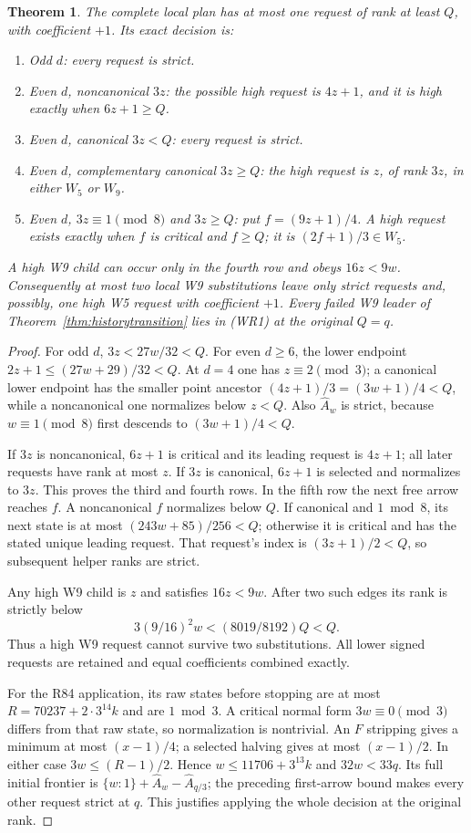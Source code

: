 \documentclass[11pt]{article}
\newtheorem{theorem}{Theorem}
\begin{document}
\begin{theorem}\label{thm:w9historyrepair}
The complete local plan has at most one request of rank at least $Q$,
with coefficient $+1$. Its exact decision is:
\begin{enumerate}
\item Odd $d$: every request is strict.
\item Even $d$, noncanonical $3z$: the possible high request is
$4z+1$, and it is high exactly when $6z+1\ge Q$.
\item Even $d$, canonical $3z<Q$: every request is strict.
\item Even $d$, complementary canonical $3z\ge Q$: the high request
is $z$, of rank $3z$, in either $W_5$ or $W_9$.
\item Even $d$, $3z\equiv1\pmod8$ and $3z\ge Q$: put
$f=(9z+1)/4$. A high request exists exactly when $f$ is critical and
$f\ge Q$; it is $(2f+1)/3\in W_5$.
\end{enumerate}
A high W9 child can occur only in the fourth row and obeys $16z<9w$.
Consequently at most two local W9 substitutions leave only strict
requests and, possibly, one high W5 request with coefficient $+1$.
Every failed W9 leader of Theorem~\ref{thm:historytransition} lies in
(WR1) at the original $Q=q$.
\end{theorem}
\begin{proof}
For odd $d$, $3z<27w/32<Q$. For even $d\ge6$, the lower endpoint
$2z+1\le(27w+29)/32<Q$. At $d=4$ one has $z\equiv2\pmod3$;
a canonical lower endpoint has the smaller point ancestor
$(4z+1)/3=(3w+1)/4<Q$, while a noncanonical one normalizes below
$z<Q$. Also $\widehat A_w$ is strict, because $w\equiv1\pmod8$
first descends to $(3w+1)/4<Q$.

If $3z$ is noncanonical, $6z+1$ is critical and its leading request
is $4z+1$; all later requests have rank at most $z$.
If $3z$ is canonical, $6z+1$ is selected and normalizes to $3z$.
This proves the third and fourth rows. In the fifth row the next free
arrow reaches $f$. A noncanonical $f$ normalizes below $Q$.
If canonical and $1\bmod8$, its next state is at most
$(243w+85)/256<Q$; otherwise it is critical and has the stated
unique leading request. That request's index is $(3z+1)/2<Q$,
so subsequent helper ranks are strict.

Any high W9 child is $z$ and satisfies $16z<9w$.
After two such edges its rank is strictly below
\[
 3(9/16)^2w<(8019/8192)Q<Q.
 \tag{WR2}
\]
Thus a high W9 request cannot survive two substitutions. All lower
signed requests are retained and equal coefficients combined exactly.

For the R84 application, its raw states before stopping are at most
$R=70237+2\cdot3^{14}k$ and are $1\bmod3$. A critical normal form
$3w\equiv0\pmod3$ differs from that raw state, so normalization is
nontrivial. An $F$ stripping gives a minimum at most $(x-1)/4$;
a selected halving gives at most $(x-1)/2$. In either case
$3w\le(R-1)/2$. Hence $w\le11706+3^{13}k$ and $32w<33q$.
Its full initial frontier is $\{w:1\}+\widehat A_w-\widehat A_{q/3}$;
the preceding first-arrow bound makes every other request strict at $q$.
This justifies applying the whole decision at the original rank.
\end{proof}
\end{document}
